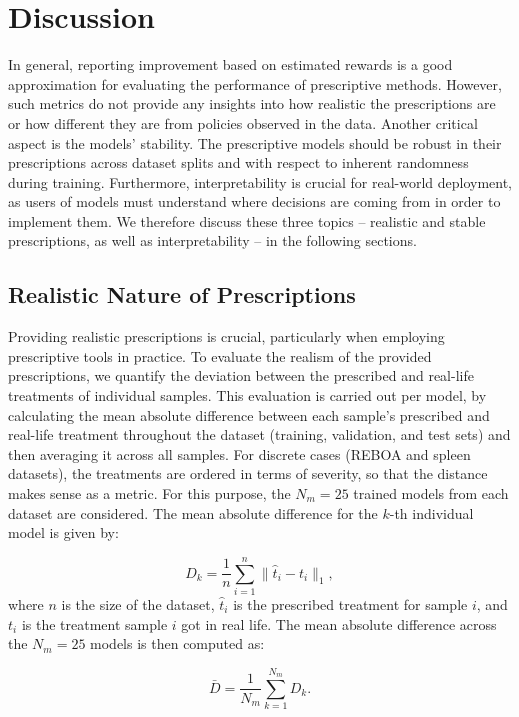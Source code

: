 \documentclass[10pt]{article} %
\begin{document}
\section{Discussion}\label{sec:real-world-discussion}
In general, reporting improvement based on estimated rewards is a good approximation for evaluating the performance of prescriptive methods. However, such metrics do not provide any insights into how realistic the prescriptions are or how different they are from policies observed in the data. Another critical aspect is the models' stability. The prescriptive models should be robust in their prescriptions across dataset splits and with respect to inherent randomness during training. Furthermore, interpretability is crucial for real-world deployment, as users of models must understand where decisions are coming from in order to implement them. We therefore discuss these three topics -- realistic and stable prescriptions, as well as interpretability -- in the following sections. 

\subsection{Realistic Nature of Prescriptions}
Providing realistic prescriptions is crucial, particularly when employing prescriptive tools in practice. To evaluate the realism of the provided prescriptions, we quantify the deviation between the prescribed and real-life treatments of individual samples. This evaluation is carried out per model, by calculating the mean absolute difference between each sample's prescribed and real-life treatment throughout the dataset (training, validation, and test sets) and then averaging it across all samples. For discrete cases (REBOA and spleen datasets), the treatments are ordered in terms of severity, so that the distance makes sense as a metric. For this purpose, the $N_m=25$ trained models from each dataset are considered. The mean absolute difference for the $k$-th individual model is given by:

\begin{equation}
    D_k = \frac{1}{n}  \sum_{i=1}^n \| \hat{t}_i - t_i \|_1,
\end{equation}
where $n$ is the size of the dataset, $\hat{t}_i$ is the prescribed treatment for sample $i$, and $t_i$ is the treatment sample $i$ got in real life. The mean absolute difference across the $N_m=25$ models is then computed as:

\begin{equation}
    \bar{D} = \frac{1}{N_m} \sum_{k=1}^{N_m} D_k.
\end{equation}
\end{document}
